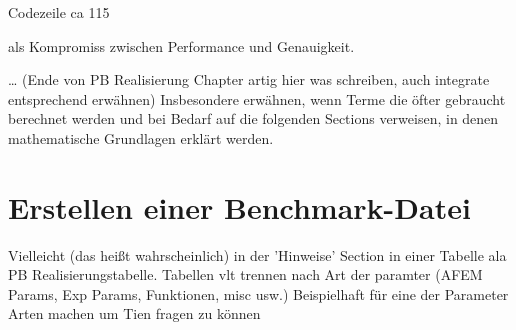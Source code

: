 Codezeile ca 115


als Kompromiss zwischen Performance und Genauigkeit.


\ldots
(Ende von PB Realisierung Chapter artig hier was schreiben, auch integrate
entsprechend erwähnen)
Insbesondere erwähnen, wenn Terme die öfter gebraucht berechnet werden und
bei Bedarf auf die folgenden Sections verweisen, in denen mathematische
Grundlagen erklärt werden.

%
%
%
%
%
%
%
%
%
%


\section{Erstellen einer Benchmark-Datei}
Vielleicht (das heißt wahrscheinlich) in der 'Hinweise' Section in einer
Tabelle ala PB Realisierungstabelle. Tabellen vlt trennen nach Art der paramter
(AFEM Params, Exp Params, Funktionen, misc usw.)
Beispielhaft für eine der Parameter Arten machen um Tien fragen zu können

